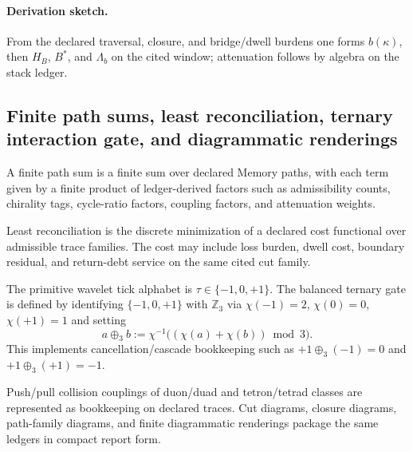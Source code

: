 \paragraph{Derivation sketch.} From the declared traversal, closure, and bridge/dwell burdens one forms $b(\kappa)$, then $H_B$, $B^*$, and $\Lambda_b$ on the cited window; attenuation follows by algebra on the stack ledger.

\subsection{Finite path sums, least reconciliation, ternary interaction gate, and diagrammatic renderings}\label{subsec:pathsum-diagram-operators}
\begin{definition}
\label{def:path-sum}
A finite path sum is a finite sum over declared Memory paths, with each term given by a finite product of ledger-derived factors such as admissibility counts, chirality tags, cycle-ratio factors, coupling factors, and attenuation weights.
\end{definition}

\begin{definition}
\label{def:least-reconciliation}
Least reconciliation is the discrete minimization of a declared cost functional over admissible trace families. The cost may include loss burden, dwell cost, boundary residual, and return-debt service on the same cited cut family.
\end{definition}

\begin{definition}
\label{def:ternary-gate}
The primitive wavelet tick alphabet is $\tau\in\{-1,0,+1\}$. The balanced ternary gate is defined by identifying $\{-1,0,+1\}$ with $\mathbb Z_3$ via $\chi(-1)=2$, $\chi(0)=0$, $\chi(+1)=1$ and setting
\[
a\oplus_3 b:=\chi^{-1}\!\bigl((\chi(a)+\chi(b))\bmod 3\bigr).
\]
This implements cancellation/cascade bookkeeping such as $+1\oplus_3(-1)=0$ and $+1\oplus_3(+1)=-1$.
\end{definition}

\begin{definition}
\label{def:collision-diagram}
Push/pull collision couplings of duon/duad and tetron/tetrad classes are represented as bookkeeping on declared traces. Cut diagrams, closure diagrams, path-family diagrams, and finite diagrammatic renderings package the same ledgers in compact report form.
\end{definition}


